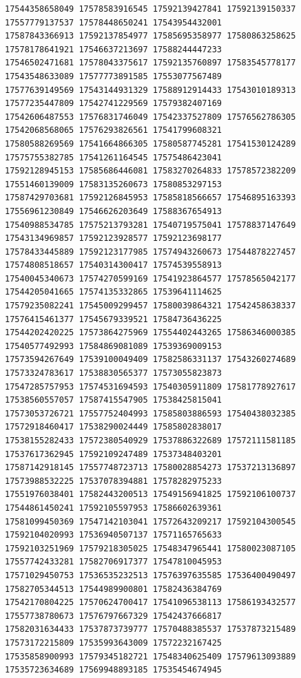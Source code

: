 \documentclass[10pt]{article}
\begin{document}
\begin{verbatim}
17544358658049 17578583916545 17592139427841 17592139150337 17557779137537 17578448650241 17543954432001
17587843366913 17592137854977 17585695358977 17580863258625 17578178641921 17546637213697 17588244447233
17546502471681 17578043375617 17592135760897 17583545778177 17543548633089 17577773891585 17553077567489
17577639149569 17543144931329 17588912914433 17543010189313 17577235447809 17542741229569 17579382407169
17542606487553 17576831746049 17542337527809 17576562786305 17542068568065 17576293826561 17541799608321
17580588269569 17541664866305 17580587745281 17541530124289 17575755382785 17541261164545 17575486423041
17592128945153 17585686446081 17583270264833 17578572382209 17551460139009 17583135260673 17580853297153
17587429703681 17592126845953 17585818566657 17546895163393 17556961230849 17546626203649 17588367654913
17540988534785 17575213793281 17540719575041 17578837147649 17543134969857 17592123928577 17592123698177
17578433445889 17592123177985 17574943260673 17544878227457 17574808518657 17540314300417 17574539558913
17540045340673 17574270599169 17541923864577 17578565042177 17544205041665 17574135332865 17539641114625
17579235082241 17545009299457 17580039864321 17542458638337 17576415461377 17545679339521 17584736436225
17544202420225 17573864275969 17554402443265 17586346000385 17540577492993 17584869081089 17539369009153
17573594267649 17539100049409 17582586331137 17543260274689 17573324783617 17538830565377 17573055823873
17547285757953 17574531694593 17540305911809 17581778927617 17538560557057 17587415547905 17538425815041
17573053726721 17557752404993 17585803886593 17540438032385 17572918460417 17538290024449 17585802838017
17538155282433 17572380540929 17537886322689 17572111581185 17537617362945 17592109247489 17537348403201
17587142918145 17557748723713 17580028854273 17537213136897 17573988532225 17537078394881 17578282975233
17551976038401 17582443200513 17549156941825 17592106100737 17544861450241 17592105597953 17586602639361
17581099450369 17547142103041 17572643209217 17592104300545 17592104020993 17536940507137 17571165765633
17592103251969 17579218305025 17548347965441 17580023087105 17557742433281 17582706917377 17547810045953
17571029450753 17536535232513 17576397635585 17536400490497 17582705344513 17544989900801 17582436384769
17542170804225 17570624700417 17541096538113 17586193432577 17557738780673 17576797667329 17542437666817
17582031634433 17537873739777 17570488385537 17537873215489 17573172215809 17535993643009 17572232167425
17535858900993 17579345182721 17548340625409 17579613093889 17535723634689 17569948893185 17535454674945

\end{verbatim}
\end{document}
